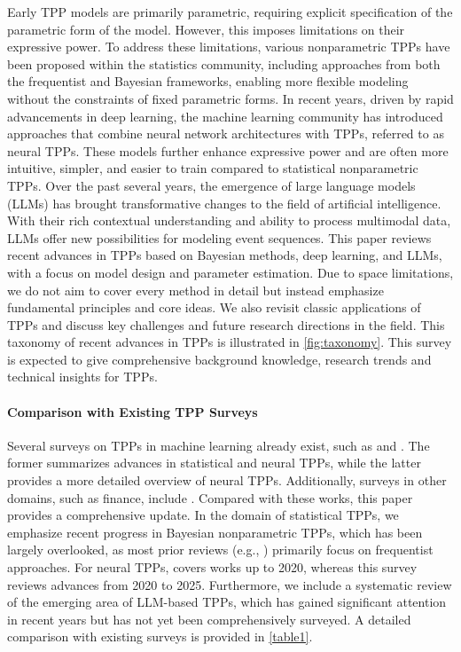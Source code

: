 \documentclass[10pt]{article} %
\begin{document}
Early TPP models are primarily parametric, requiring explicit specification of the parametric form of the model. However, this imposes limitations on their expressive power. 
To address these limitations, various nonparametric TPPs have been proposed within the statistics community, including approaches from both the frequentist and Bayesian frameworks, enabling more flexible modeling without the constraints of fixed parametric forms. 
In recent years, driven by rapid advancements in deep learning, the machine learning community has introduced approaches that combine neural network architectures with TPPs, referred to as neural TPPs. These models further enhance expressive power and are often more intuitive, simpler, and easier to train compared to statistical nonparametric TPPs. Over the past several years, the emergence of large language models (LLMs) has brought transformative changes to the field of artificial intelligence. With their rich contextual understanding and ability to process multimodal data, LLMs offer new possibilities for modeling event sequences. 
This paper reviews recent advances in TPPs based on Bayesian methods, deep learning, and LLMs, with a focus on model design and parameter estimation. Due to space limitations, we do not aim to cover every method in detail but instead emphasize fundamental principles and core ideas. We also revisit classic applications of TPPs and discuss key challenges and future research directions in the field. 
This taxonomy of recent advances in TPPs is illustrated in \cref{fig:taxonomy}. This survey is expected to give comprehensive background knowledge, research trends and technical insights for TPPs. 



\paragraph{Comparison with Existing TPP Surveys} Several surveys on TPPs in machine learning already exist, such as \citet{yan2019recent} and \citet{shchur2021neural}. The former summarizes advances in statistical and neural TPPs, while the latter provides a more detailed overview of neural TPPs. Additionally, surveys in other domains, such as finance, include \citet{hawkes2018hawkes}.
Compared with these works, this paper provides a comprehensive update. In the domain of statistical TPPs, we emphasize recent progress in Bayesian nonparametric TPPs, which has been largely overlooked, as most prior reviews (e.g., \citet{yan2019recent}) primarily focus on frequentist approaches. For neural TPPs, \citet{shchur2021neural} covers works up to 2020, whereas this survey reviews advances from 2020 to 2025. Furthermore, we include a systematic review of the emerging area of LLM-based TPPs, which has gained significant attention in recent years but has not yet been comprehensively surveyed. A detailed comparison with existing surveys is provided in \cref{table1}. 
\end{document}
